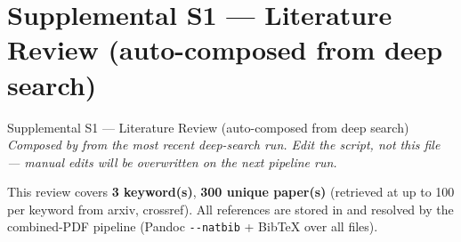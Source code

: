 \documentclass[
  ignorenonframetext,
]{beamer}
\author{\texorpdfstring{}{}}
\date{}
\begin{document}
\begin{frame}
\newpage
\end{frame}

\section{Supplemental S1 --- Literature Review (auto-composed from deep
search)}\label{sec:supplemental_s1}

\begin{frame}{Supplemental S1 --- Literature
Review (auto-composed from deep search)}
\emph{Composed by 
from the most recent deep-search run. Edit the script, not this file ---
manual edits will be overwritten on the next pipeline run.}

This review covers \textbf{3 keyword(s)}, \textbf{300 unique paper(s)}
(retrieved at up to 100 per keyword from arxiv, crossref). All
references are stored in  and
resolved by the combined-PDF pipeline (Pandoc \texttt{-\/-natbib} +
BibTeX over all  files).
\end{frame}
\end{document}
